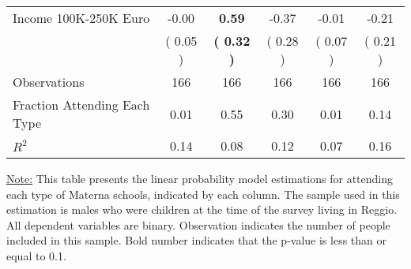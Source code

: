 \begin{table}[H]
{\begin{tabular}{lccccc}
\quad Income 100K-250K Euro &     -0.00 & \textbf{     0.59} &     -0.37 &     -0.01 &     -0.21 \\
\quad  & (     0.05 ) & \textbf{(     0.32 )}  & (     0.28 )  & (     0.07 ) & (     0.21 ) \\
\midrule
Observations & 166 & 166 & 166 & 166 & 166 \\
Fraction Attending Each Type &      0.01 &      0.55 &      0.30 &      0.01 &      0.14 \\
\midrule
$ R^2$ &      0.14 &      0.08 &      0.12 &      0.07 &      0.16 \\
\bottomrule
\end{tabular}}
\end{table}
\begin{footnotesize}
\noindent\underline{Note:} This table presents the linear probability model estimations for attending each type of Materna schools, indicated by each column. The sample used in this estimation is males who were children at the time of the survey living in Reggio. All dependent variables are binary. Observation indicates the number of people included in this sample. Bold number indicates that the p-value is less than or equal to 0.1.
\end{footnotesize}
